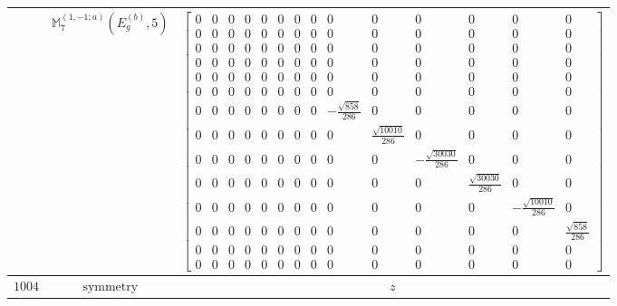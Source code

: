 \documentclass[fleqn,8pt,landscape]{jsarticle}
\begin{document}
\begin{longtable}{ccc}
$  $ & $ \mathbb{M}_{7}^{(1,-1;a)}(E_{g}^{(b)},5) $ & $ \begin{bmatrix} 0 & 0 & 0 & 0 & 0 & 0 & 0 & 0 & 0 & 0 & 0 & 0 & 0 & 0 \\ 0 & 0 & 0 & 0 & 0 & 0 & 0 & 0 & 0 & 0 & 0 & 0 & 0 & 0 \\ 0 & 0 & 0 & 0 & 0 & 0 & 0 & 0 & 0 & 0 & 0 & 0 & 0 & 0 \\ 0 & 0 & 0 & 0 & 0 & 0 & 0 & 0 & 0 & 0 & 0 & 0 & 0 & 0 \\ 0 & 0 & 0 & 0 & 0 & 0 & 0 & 0 & 0 & 0 & 0 & 0 & 0 & 0 \\ 0 & 0 & 0 & 0 & 0 & 0 & 0 & 0 & 0 & 0 & 0 & 0 & 0 & 0 \\ 0 & 0 & 0 & 0 & 0 & 0 & 0 & 0 & - \frac{\sqrt{858}}{286} & 0 & 0 & 0 & 0 & 0 \\ 0 & 0 & 0 & 0 & 0 & 0 & 0 & 0 & 0 & \frac{\sqrt{10010}}{286} & 0 & 0 & 0 & 0 \\ 0 & 0 & 0 & 0 & 0 & 0 & 0 & 0 & 0 & 0 & - \frac{\sqrt{30030}}{286} & 0 & 0 & 0 \\ 0 & 0 & 0 & 0 & 0 & 0 & 0 & 0 & 0 & 0 & 0 & \frac{\sqrt{30030}}{286} & 0 & 0 \\ 0 & 0 & 0 & 0 & 0 & 0 & 0 & 0 & 0 & 0 & 0 & 0 & - \frac{\sqrt{10010}}{286} & 0 \\ 0 & 0 & 0 & 0 & 0 & 0 & 0 & 0 & 0 & 0 & 0 & 0 & 0 & \frac{\sqrt{858}}{286} \\ 0 & 0 & 0 & 0 & 0 & 0 & 0 & 0 & 0 & 0 & 0 & 0 & 0 & 0 \\ 0 & 0 & 0 & 0 & 0 & 0 & 0 & 0 & 0 & 0 & 0 & 0 & 0 & 0 \end{bmatrix} $ \\ \hline
$ 1004 $ & $ \text{symmetry} $ & $ z $ \\

\end{longtable}
\end{document}
